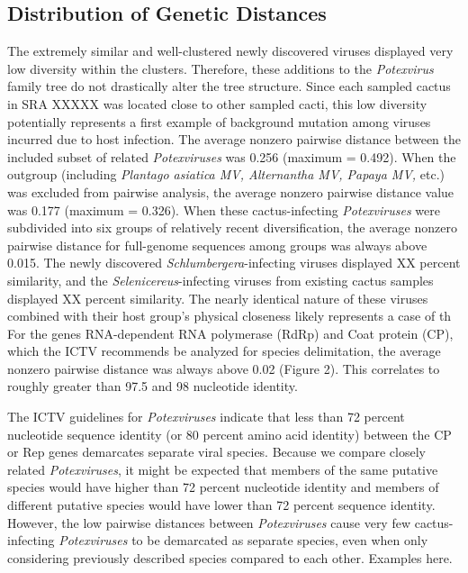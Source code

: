 \documentclass[11pt,letterpaper,titlepage]{article}
\begin{document}
\begin{linenumbers}
\subsection*{Distribution of Genetic Distances}
The extremely similar and well-clustered newly discovered viruses displayed very low diversity within the clusters.
Therefore, these additions to the \textit{Potexvirus} family tree do not drastically alter the tree structure.
Since each sampled cactus in SRA XXXXX was located close to other sampled cacti, this low diversity potentially represents a first example of background mutation among viruses incurred due to host infection.
The average nonzero pairwise distance between the included subset of related \textit{Potexviruses} was 0.256 (maximum = 0.492). 
When the outgroup (including \textit{Plantago asiatica MV, Alternantha MV, Papaya MV,} etc.) was excluded from pairwise analysis, the average nonzero pairwise distance value was 0.177 (maximum = 0.326). 
When these cactus-infecting \textit{Potexviruses} were subdivided into six groups of relatively recent diversification, the average nonzero pairwise distance for full-genome sequences among groups was always above 0.015. 
The newly discovered \textit{Schlumbergera}-infecting viruses displayed XX percent similarity, and the \textit{Selenicereus}-infecting viruses from existing cactus samples displayed XX percent similarity.
The nearly identical nature of these viruses combined with their host group's physical closeness likely represents a case of th
For the genes RNA-dependent RNA polymerase (RdRp) and Coat protein (CP), which the ICTV recommends be analyzed for species delimitation, the average nonzero pairwise distance was always above 0.02 (Figure 2). 
This correlates to roughly greater than 97.5 and 98 nucleotide identity. 


The ICTV guidelines for \textit{Potexviruses} indicate that less than 72 percent nucleotide sequence identity (or 80 percent amino acid identity) between the CP or Rep genes demarcates separate viral species.
Because we compare closely related \textit{Potexviruses}, it might be expected that members of the same putative species would have higher than 72 percent nucleotide identity and members of different putative species would have lower than 72 percent sequence identity.
However, the low pairwise distances between \textit{Potexviruses} cause very few cactus-infecting \textit{Potexviruses} to be demarcated as separate species, even when only considering previously described species compared to each other.
Examples here.



\end{linenumbers}
\end{document}
